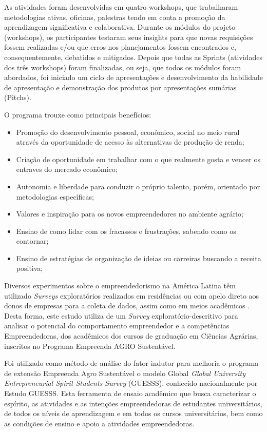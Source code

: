 As atividades foram desenvolvidas em quatro workshops, que trabalharam metodologias ativas, oficinas, palestras tendo em conta a promoção da aprendizagem significativa e colaborativa. Durante os módulos do projeto (workshops), os participantes testaram seus insights para que novas requisições fossem realizadas e/ou que erros nos planejamentos fossem encontrados e, consequentemente, debatidos e mitigados. Depois que todas as Sprints (atividades dos três workshops) foram finalizadas, ou seja, que todos os módulos foram abordados, foi iniciado um ciclo de apresentações e desenvolvimento da habilidade de apresentação e demonstração dos produtos por apresentações sumárias (Pitchs). 

O programa trouxe como principais benefícios: 

\begin{itemize}
\item{Promoção do desenvolvimento pessoal, econômico, social no meio rural através da oportunidade de acesso às alternativas de produção de renda;}
\item{Criação de oportunidade em trabalhar com o que realmente gosta e vencer os entraves do mercado econômico;}
\item{Autonomia e liberdade para conduzir o próprio talento, porém, orientado por metodologias específicas;}
\item{Valores e inspiração para os novos empreendedores no ambiente agrário;}
\item{Ensino de como lidar com os fracassos e frustrações, sabendo como os contornar;}
\item{Ensino de estratégias de organização de ideias ou carreiras buscando a receita positiva;}
\end{itemize}



Diversos experimentos sobre o empreendedorismo na América Latina têm utilizado \textit{Surveys} exploratórios realizados em residências ou com apelo direto aos donos de empresas para a coleta de dados, assim como em meios acadêmicos \cite{lima_ser_2015}. Desta forma, este estudo utiliza de um \textit{Survey} exploratório-descritivo para analisar o potencial do comportamento empreendedor e a competências Empreendedoras, dos acadêmicos dos cursos de graduação em Ciências Agrárias, inscritos no Programa Empreenda AGRO Sustentável. 

Foi utilizado como método de análise do fator indutor para melhoria o programa de extensão Empreenda Agro Sustentável o modelo Global \textit{Global University Entrepreneurial Spirit Students Survey} (GUESSS), conhecido nacionalmente por Estudo GUESSS. Esta ferramenta de ensaio acadêmico que busca caracterizar o espírito, as atividades e as intenções empreendedoras de estudantes universitários, de todos os níveis de aprendizagem e em todos os cursos universitários, bem como as condições de ensino e apoio a atividades empreendedoras.


